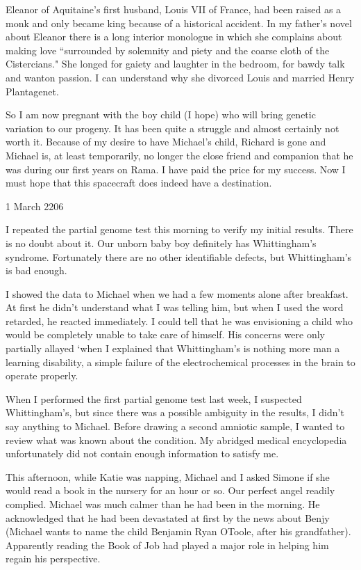 \documentclass[]{article}
\begin{document}
Eleanor of Aquitaine’s first husband, Louis VII of France, had been raised as a monk and only became king because of a historical accident.  In my father’s novel about Eleanor there is a long interior monologue in which she complains about making love “surrounded by solemnity and piety and the coarse cloth of the Cistercians."  She longed for gaiety and laughter in the bedroom, for bawdy talk and wanton passion.  I can understand why she divorced Louis and married Henry Plantagenet.

So I am now pregnant with the boy child (I hope) who will bring genetic variation to our progeny.  It has been quite a struggle and almost certainly not worth it.  Because of my desire to have Michael’s child, Richard is gone and Michael is, at least temporarily, no longer the close friend and companion that he was during our first years on Rama.  I have paid the price for my success.  Now I must hope that this spacecraft does indeed have a destination.

1 March 2206

I repeated the partial genome test this morning to verify my initial results.  There is no doubt about it.  Our unborn baby boy definitely has Whittingham’s syndrome.  Fortunately there are no other identifiable defects, but Whittingham’s is bad enough.

I showed the data to Michael when we had a few moments alone after breakfast.  At first he didn’t understand what I was telling him, but when I used the word retarded, he reacted immediately.  I could tell that he was envisioning a child who would be completely unable to take care of himself.  His concerns were only partially allayed ‘when I explained that Whittingham’s is nothing more man a learning disability, a simple failure of the electrochemical processes in the brain to operate properly.

When I performed the first partial genome test last week, I suspected Whittingham’s, but since there was a possible ambiguity in the results, I didn’t say anything to Michael.  Before drawing a second amniotic sample, I wanted to review what was known about the condition.  My abridged medical encyclopedia unfortunately did not contain enough information to satisfy me.

This afternoon, while Katie was napping, Michael and I asked Simone if she would read a book in the nursery for an hour or so.  Our perfect angel readily complied.  Michael was much calmer than he had been in the morning.  He acknowledged that he had been devastated at first by the news about Benjy (Michael wants to name the child Benjamin Ryan OToole, after his grandfather).  Apparently reading the Book of Job had played a major role in helping him regain his perspective.
\end{document}

